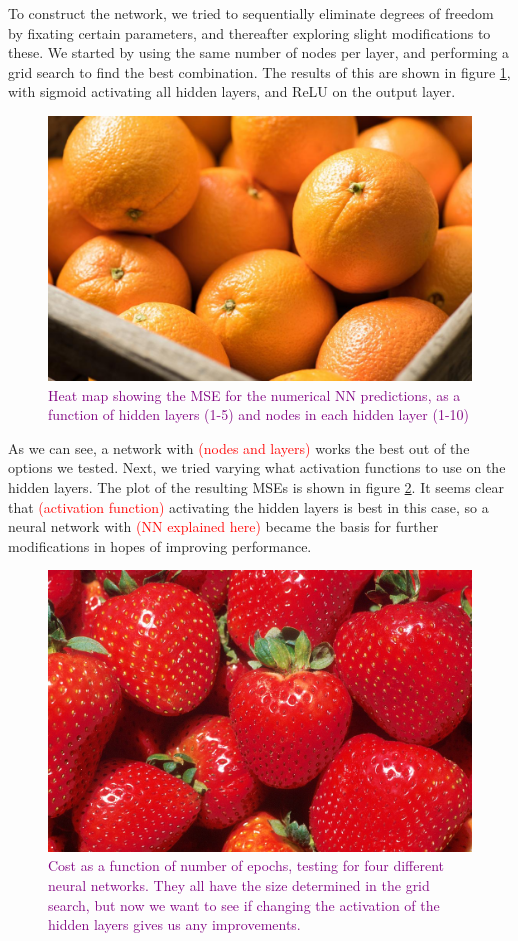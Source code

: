 To construct the network, we tried to sequentially eliminate degrees of freedom by fixating certain parameters, and thereafter exploring slight modifications to these. We started by using the same number of nodes per layer, and performing a grid search to find the best combination. The results of this are shown in figure \ref{fig:gridsearch_numpred_layers_nodes}, with sigmoid activating all hidden layers, and ReLU on the output layer.
\begin{figure}
    \centering
    \includegraphics[width=0.5\linewidth]{figures/placeholders/gridsearch_numpred_layers_nodes.png}
    \caption{\textcolor{purple}{Heat map showing the MSE for the numerical NN predictions, as a function of hidden layers (1-5) and nodes in each hidden layer (1-10)}}
    \label{fig:gridsearch_numpred_layers_nodes}
\end{figure}

As we can see, a network with \textcolor{red}{(nodes and layers)} works the best out of the options we tested. Next, we tried varying what activation functions to use on the hidden layers. The plot of the resulting MSEs is shown in figure \ref{fig:activationfunctions_cost_numpred}. It seems clear that \textcolor{red}{(activation function)} activating the hidden layers is best in this case, so a neural network with \textcolor{red}{(NN explained here)} became the basis for further modifications in hopes of improving performance. 
\begin{figure}
    \centering
    \includegraphics[width=0.5\linewidth]{figures/placeholders/activationfunctions_cost_numpred.png}
    \caption{\textcolor{purple}{Cost as a function of number of epochs, testing for four different neural networks. They all have the size determined in the grid search, but now we want to see if changing the activation of the hidden layers gives us any improvements.}}
    \label{fig:activationfunctions_cost_numpred}
\end{figure}

